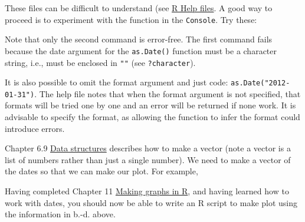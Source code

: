 \documentclass[]{book}
\newenvironment{Shaded}{\begin{snugshade}}{\end{snugshade}}
\newcommand{\KeywordTok}[1]{\textcolor[rgb]{0.13,0.29,0.53}{\textbf{{#1}}}}
\newcommand{\DataTypeTok}[1]{\textcolor[rgb]{0.13,0.29,0.53}{{#1}}}
\newcommand{\DecValTok}[1]{\textcolor[rgb]{0.00,0.00,0.81}{{#1}}}
\newcommand{\StringTok}[1]{\textcolor[rgb]{0.31,0.60,0.02}{{#1}}}
\newcommand{\NormalTok}[1]{{#1}}
\begin{document}
These files can be difficult to understand (see
\href{https://ahurford.github.io/quant-guide-all-courses/help.html\#how-to-interpret-r-help-files}{R
Help files}. A good way to proceed is to experiment with the function in
the \texttt{Console}. Try these:

\begin{Shaded}
\end{Shaded}

Note that only the second command is error-free. The first command fails
because the date argument for the \texttt{as.Date()} function must be a
character string, i.e., must be enclosed in \texttt{""} (see
\texttt{?character}).

It is also possible to omit the format argument and just code:
\texttt{as.Date("2012-01-31")}. The help file notes that when the format
argument is not specified, that formats will be tried one by one and an
error will be returned if none work. It is advisable to specify the
format, as allowing the function to infer the format could introduce
errors.

Chapter 6.9
\href{https://ahurford.github.io/quant-guide-all-courses/rintro.html\#data-structures}{Data
structures} describes how to make a vector (note a vector is a list of
numbers rather than just a single number). We need to make a vector of
the dates so that we can make our plot. For example,

\begin{Shaded}
\end{Shaded}

Having completed Chapter 11
\href{https://ahurford.github.io/quant-guide-all-courses/graph.html}{Making
graphs in R}, and having learned how to work with dates, you should now
be able to write an R script to make plot using the information in b.-d.
above.
\end{document}
